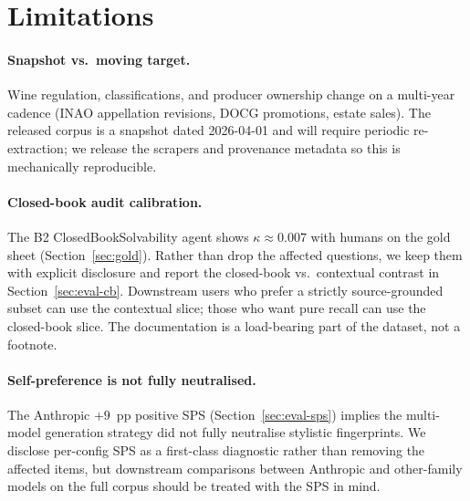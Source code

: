 \section{Limitations}
\label{sec:limitations}

\paragraph{Snapshot vs.\ moving target.} Wine regulation,
classifications, and producer ownership change on a multi-year cadence
(INAO appellation revisions, DOCG promotions, estate sales). The
released corpus is a snapshot dated 2026-04-01 and will require
periodic re-extraction; we release the scrapers and provenance
metadata so this is mechanically reproducible.

\paragraph{Closed-book audit calibration.} The B2 ClosedBookSolvability
agent shows $\kappa\approx0.007$ with humans on the gold sheet
(Section~\ref{sec:gold}). Rather than drop the affected questions, we
keep them with explicit disclosure and report the closed-book vs.\
contextual contrast in Section~\ref{sec:eval-cb}. Downstream users who
prefer a strictly source-grounded subset can use the contextual slice;
those who want pure recall can use the closed-book slice. The
documentation is a load-bearing part of the dataset, not a footnote.

\paragraph{Self-preference is not fully neutralised.} The Anthropic
$+9$~pp positive SPS (Section~\ref{sec:eval-sps}) implies the
multi-model generation strategy did not fully neutralise stylistic
fingerprints. We disclose per-config SPS as a first-class diagnostic
rather than removing the affected items, but downstream comparisons
between Anthropic and other-family models on the full corpus should
be treated with the SPS in mind.

